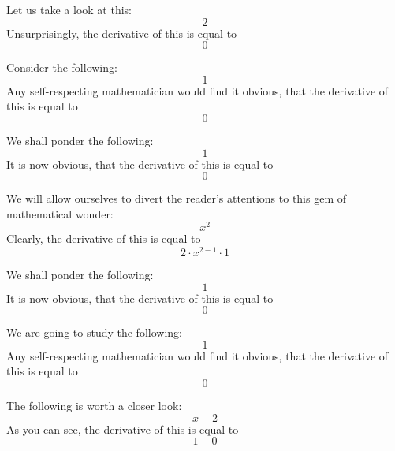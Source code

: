 \documentclass{article}
\begin{document}
Let us take a look at this:
\begin{equation}
2 
\end{equation}
Unsurprisingly, the derivative of this is equal to
\begin{equation}
0 
\end{equation}

Consider the following:
\begin{equation}
1 
\end{equation}
Any self-respecting mathematician would find it obvious, that the derivative of this is equal to
\begin{equation}
0 
\end{equation}

We shall ponder the following:
\begin{equation}
1 
\end{equation}
It is now obvious, that the derivative of this is equal to
\begin{equation}
0 
\end{equation}

We will allow ourselves to divert the reader's attentions to this gem of mathematical wonder:
\begin{equation}
x ^{2 } 
\end{equation}
Clearly, the derivative of this is equal to
\begin{equation}
2 \cdot x ^{2 - 1 } \cdot 1 
\end{equation}

We shall ponder the following:
\begin{equation}
1 
\end{equation}
It is now obvious, that the derivative of this is equal to
\begin{equation}
0 
\end{equation}

We are going to study the following:
\begin{equation}
1 
\end{equation}
Any self-respecting mathematician would find it obvious, that the derivative of this is equal to
\begin{equation}
0 
\end{equation}

The following is worth a closer look:
\begin{equation}
x - 2 
\end{equation}
As you can see, the derivative of this is equal to
\begin{equation}
1 - 0 
\end{equation}
\end{document}
